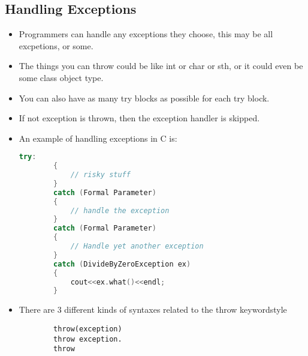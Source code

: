 \documentclass[11pt]{article}
\begin{document}
\subsection{Handling Exceptions}
\begin{itemize}
	\item Programmers can handle any exceptions they choose, this may be all excpetions, or some. 
	\item The things you can throw could be like int or char or sth, or it could even be some class object type. 
	\item You can also have as many try blocks as possible for each try block. 
	\item If not exception is thrown, then the exception handler is skipped. 
	\item An example of handling exceptions in C is: 
	\begin{lstlisting}[language=C++]
		try:
		{
			// risky stuff
		}
		catch (Formal Parameter)
		{
			// handle the exception
		}
		catch (Formal Parameter)
		{
			// Handle yet another exception
		}
		catch (DivideByZeroException ex)
		{
			cout<<ex.what()<<endl;
		}
	\end{lstlisting}
	\item There are 3 different kinds of syntaxes related to the throw keywordstyle
	\begin{lstlisting}
		throw(exception)
		throw exception.
		throw
	\end{lstlisting}
\end{itemize}
\end{document}
